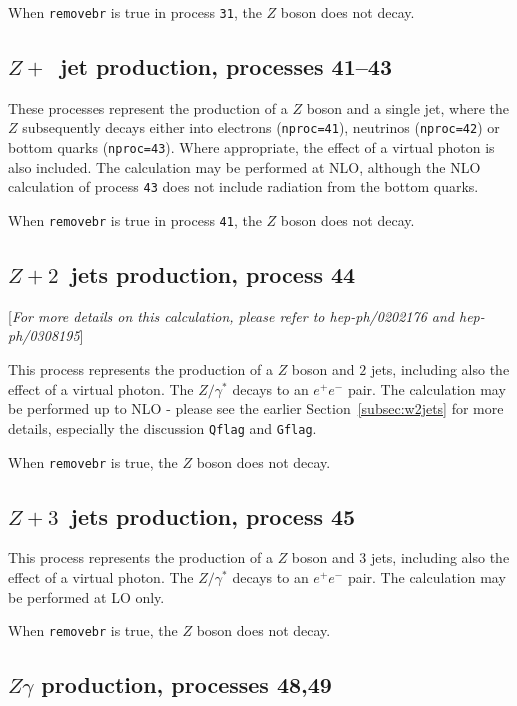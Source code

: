 \documentclass[12pt]{article}
\begin{document}
When {\tt removebr} is true in process {\tt 31}, the $Z$ boson does not decay.

\subsection{$Z+$~jet production, processes 41--43}
\label{subsec:zjet}

These processes represent the production of a $Z$ boson and a single jet,
where the $Z$ subsequently
decays either into electrons ({\tt nproc=41}), neutrinos ({\tt nproc=42})
or bottom quarks ({\tt nproc=43}). Where appropriate, the effect of a virtual
photon is also included. The calculation may be performed at NLO,
although the NLO calculation of process {\tt 43} does not include radiation
from the bottom quarks.

When {\tt removebr} is true in process {\tt 41}, the $Z$ boson does not decay.

\subsection{$Z+2$~jets production, process 44}
\label{subsec:z2jets}

\begin{center}
[{\it For more details on this calculation, please refer to \break
 hep-ph/0202176 and hep-ph/0308195}]
\end{center}

This process represents the production of a $Z$ boson and $2$ jets,
including also the effect of a virtual photon. The $Z/\gamma^*$ decays
to an $e^+ e^-$ pair.  The calculation may be performed up to NLO -
please see the earlier Section~\ref{subsec:w2jets} for more details,
especially the discussion {\tt Qflag} and {\tt Gflag}.

When {\tt removebr} is true, the $Z$ boson does not decay.

\subsection{$Z+3$~jets production, process 45}
\label{subsec:z3jets}

This process represents the production of a $Z$ boson and $3$ jets,
including also the effect of a virtual photon. The $Z/\gamma^*$ decays
to an $e^+ e^-$ pair.  The calculation may be performed at LO only.

When {\tt removebr} is true, the $Z$ boson does not decay.

\subsection{$Z\gamma$ production, processes 48,49}
\label{subsec:zgamma}
\end{document}
